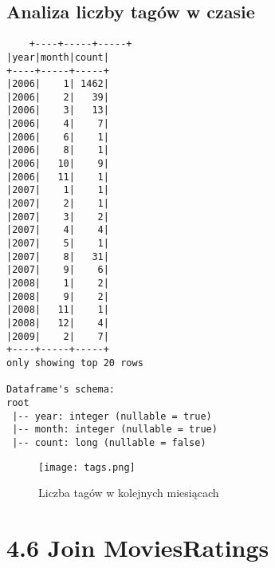 \documentclass{article}
\begin{document}
\subsection{Analiza liczby tagów w czasie}

\begin{verbatim}
    +----+-----+-----+
|year|month|count|
+----+-----+-----+
|2006|    1| 1462|
|2006|    2|   39|
|2006|    3|   13|
|2006|    4|    7|
|2006|    6|    1|
|2006|    8|    1|
|2006|   10|    9|
|2006|   11|    1|
|2007|    1|    1|
|2007|    2|    1|
|2007|    3|    2|
|2007|    4|    4|
|2007|    5|    1|
|2007|    8|   31|
|2007|    9|    6|
|2008|    1|    2|
|2008|    9|    2|
|2008|   11|    1|
|2008|   12|    4|
|2009|    2|    7|
+----+-----+-----+
only showing top 20 rows

Dataframe's schema:
root
 |-- year: integer (nullable = true)
 |-- month: integer (nullable = true)
 |-- count: long (nullable = false)
\end{verbatim}

\begin{figure}[H]
    \centering
    \texttt{[image: tags.png]}
    \caption{Liczba tagów w kolejnych miesiącach}
    \label{fig:enter-label}
\end{figure}

\section{4.6 Join MoviesRatings}
\end{document}
